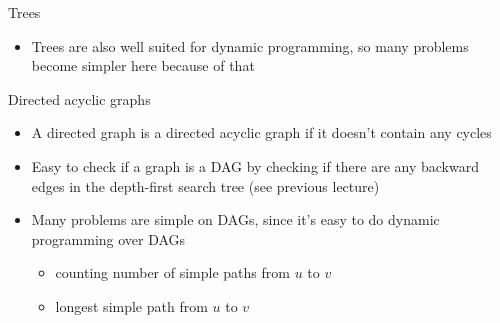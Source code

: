 \documentclass[10pt]{beamer}
\newcommand{\bi}{\begin{itemize}}
\newcommand{\ei}{\end{itemize}}
\begin{document}
\begin{frame}{Trees}
    \bi
        \item Trees are also well suited for dynamic programming, so many problems become simpler here because of that
    \ei
\end{frame}

\begin{frame}{Directed acyclic graphs}
    \bi
        \item A directed graph is a directed acyclic graph if it doesn't contain any cycles
    \vspace{10pt}
\item Easy to check if a graph is a DAG by checking if there are any backward edges in the depth-first search tree (see previous lecture)
    \vspace{10pt}
\item Many problems are simple on DAGs, since it's easy to do dynamic programming over DAGs
        \bi
            \item counting number of simple paths from $u$ to $v$
            \item longest simple path from $u$ to $v$
        \ei
    \ei
\end{frame}
\end{document}
